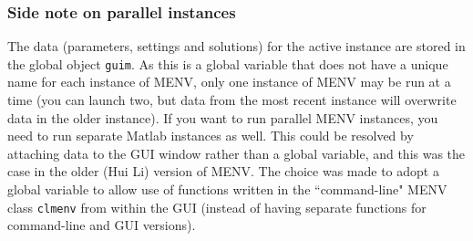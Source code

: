 \documentclass[../menv_main.tex]{subfiles}
\begin{document}
\subsubsection{Side note on parallel instances}
The data (parameters, settings and solutions) for the active instance are stored in the global object \verb|guim|. As this is a global variable that does not have a unique name for each instance of MENV, only one instance of MENV may be run at a time (you can launch two, but data from the most recent instance will overwrite data in the older instance). If you want to run parallel MENV instances, you need to run separate Matlab instances as well. This could be resolved by attaching data to the GUI window rather than a global variable, and this was the case in the older (Hui Li) version of MENV. The choice was made to adopt a global variable to allow use of functions written in the ``command-line" MENV class \verb|clmenv| from within the GUI (instead of having separate functions for command-line and GUI versions).
\end{document}
